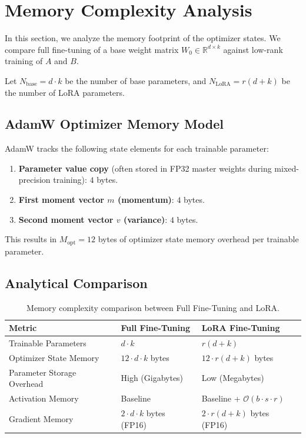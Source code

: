 \documentclass{article}
\begin{document}
\section{Memory Complexity Analysis}
In this section, we analyze the memory footprint of the optimizer states. We compare full fine-tuning of a base weight matrix $W_0 \in \mathbb{R}^{d \times k}$ against low-rank training of $A$ and $B$.

Let $N_{\text{base}} = d \cdot k$ be the number of base parameters, and $N_{\text{LoRA}} = r(d + k)$ be the number of LoRA parameters.

\subsection{AdamW Optimizer Memory Model}
AdamW tracks the following state elements for each trainable parameter:
\begin{enumerate}
  \item \textbf{Parameter value copy} (often stored in FP32 master weights during mixed-precision training): $4$ bytes.
  \item \textbf{First moment vector $m$ (momentum)}: $4$ bytes.
  \item \textbf{Second moment vector $v$ (variance)}: $4$ bytes.
\end{enumerate}
This results in $M_{\text{opt}} = 12$ bytes of optimizer state memory overhead per trainable parameter.

\subsection{Analytical Comparison}
\begin{table}[h]\centering
\begin{tabular}{lll}\toprule
\textbf{Metric} & \textbf{Full Fine-Tuning} & \textbf{LoRA Fine-Tuning} \\\midrule
Trainable Parameters & $d \cdot k$ & $r(d + k)$ \\
Optimizer State Memory & $12 \cdot d \cdot k$ bytes & $12 \cdot r(d + k)$ bytes \\
Parameter Storage Overhead & High (Gigabytes) & Low (Megabytes) \\
Activation Memory & Baseline & Baseline + $\mathcal{O}(b \cdot s \cdot r)$ \\
Gradient Memory & $2 \cdot d \cdot k$ bytes (FP16) & $2 \cdot r(d + k)$ bytes (FP16) \\\bottomrule
\end{tabular}
\caption{Memory complexity comparison between Full Fine-Tuning and LoRA.}
\end{table}
\end{document}
